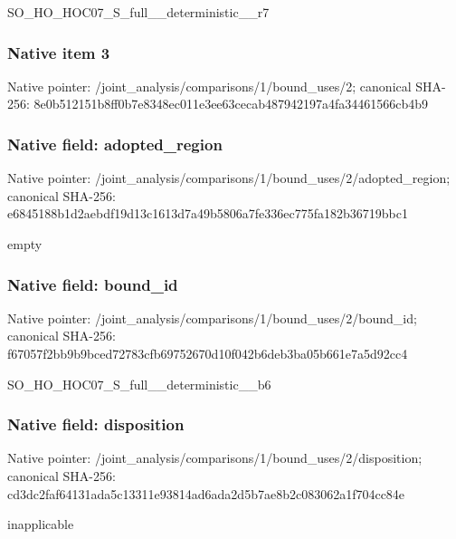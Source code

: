 \documentclass[10pt,a4paper]{article}
\begin{document}
\begingroup\raggedright\sloppy SO\_\allowbreak{}HO\_\allowbreak{}HOC07\_\allowbreak{}S\_\allowbreak{}full\_\allowbreak{}\_\allowbreak{}deterministic\_\allowbreak{}\_\allowbreak{}r7\par\endgroup

\subsubsection{Native item 3}
Native pointer: /joint\_\allowbreak{}analysis/comparisons/1/bound\_\allowbreak{}uses/2; canonical SHA-256: 8e0b512151b8ff0b7e8348ec011e3ee63cecab487942197a4fa34461566cb4b9

\subsubsection{Native field: adopted\_\allowbreak{}region}
Native pointer: /joint\_\allowbreak{}analysis/comparisons/1/bound\_\allowbreak{}uses/2/adopted\_\allowbreak{}region; canonical SHA-256: e6845188b1d2aebdf19d13c1613d7a49b5806a7fe336ec775fa182b36719bbc1

\begingroup\raggedright\sloppy empty\par\endgroup

\subsubsection{Native field: bound\_\allowbreak{}id}
Native pointer: /joint\_\allowbreak{}analysis/comparisons/1/bound\_\allowbreak{}uses/2/bound\_\allowbreak{}id; canonical SHA-256: f67057f2bb9b9bced72783cfb69752670d10f042b6deb3ba05b661e7a5d92cc4

\begingroup\raggedright\sloppy SO\_\allowbreak{}HO\_\allowbreak{}HOC07\_\allowbreak{}S\_\allowbreak{}full\_\allowbreak{}\_\allowbreak{}deterministic\_\allowbreak{}\_\allowbreak{}b6\par\endgroup

\subsubsection{Native field: disposition}
Native pointer: /joint\_\allowbreak{}analysis/comparisons/1/bound\_\allowbreak{}uses/2/disposition; canonical SHA-256: cd3dc2faf64131ada5c13311e93814ad6ada2d5b7ae8b2c083062a1f704cc84e

\begingroup\raggedright\sloppy inapplicable\par\endgroup
\end{document}
